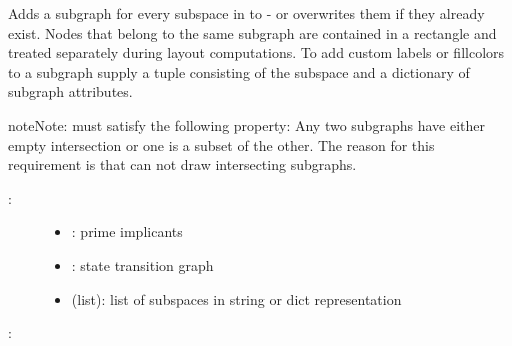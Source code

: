 \documentclass[letterpaper,10pt,english]{sphinxmanual}
\begin{document}
\begin{fulllineitems}
\label{\detokenize{StateTransitionGraphs:PyBoolNet.StateTransitionGraphs.add_style_subspaces}}
Adds a  subgraph for every subspace in  to  - or overwrites them if they already exist.
Nodes that belong to the same  subgraph are contained in a rectangle and treated separately during layout computations.
To add custom labels or fillcolors to a subgraph supply a tuple consisting of the
subspace and a dictionary of subgraph attributes.

\begin{sphinxadmonition}{note}{Note:}
 must satisfy the following property:
Any two subgraphs have either empty intersection or one is a subset of the other.
The reason for this requirement is that  can not draw intersecting subgraphs.
\end{sphinxadmonition}
\begin{description}
\item[{:}] \leavevmode\begin{itemize}
\item {} 
: prime implicants

\item {} 
: state transition graph

\item {} 
 (list): list of subspaces in string or dict representation

\end{itemize}

\end{description}

:


\end{fulllineitems}
\end{document}
